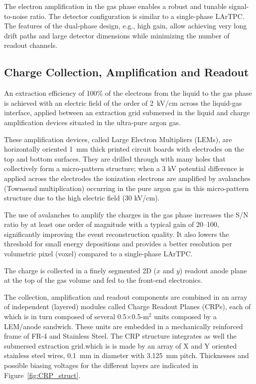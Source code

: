 The electron amplification in the gas phase enables a robust and tunable signal-to-noise ratio. 
The detector configuration is similar to a single-phase LArTPC. The features of the dual-phase design, e.g., high gain, 
allow achieving very long drift paths and large detector dimensions while minimizing the number of readout channels.

\subsection{Charge Collection, Amplification and Readout}

An extraction efficiency of 100\% of the electrons from the liquid to
the gas phase is achieved with an electric field of the order of
2~kV/cm across the liquid-gas interface, applied between an 
extraction grid submersed in the liquid and charge amplification 
devices situated in the ultra-pure argon gas. 

These amplification devices, called Large Electron Multipliers (LEMs), are horizontally oriented 1~mm thick printed 
circuit boards with electrodes on the top and bottom surfaces. They are drilled
through with many holes that collectively form a micro-pattern structure;  
when a 3 kV potential difference is applied across the electrodes
the ionization electrons are amplified by avalanches (Townsend multiplication) occurring in the 
pure argon gas in this micro-pattern structure\cite{Bondar:2008yw} due to the high electric field (30 kV/cm).

The use of avalanches to amplify the charges in the gas phase increases
the S/N ratio by at least one order of magnitude with a typical gain of 20--100, significantly
improving the event reconstruction quality. It also lowers the
threshold for small energy depositions and provides a better
resolution per volumetric pixel (voxel) compared to a single-phase
LArTPC. 

The charge is collected in a finely segmented 2D ($x$ and $y$) readout anode
plane at the top of the gas volume and fed to the front-end electronics.   

The  collection, amplification and readout components are combined in an array of 
independent (layered) modules called Charge Readout Planes (CRPs), each of which is in
 turn composed of several 0.5$\times$0.5-m$^2$ units composed  by a LEM/anode sandwich. 
These units are embedded in a mechanically reinforced frame of FR-4 and Stainless Steel. The CRP structure integrates
as well the submersed extraction grid.which is is made by an array of X and Y oriented stainless steel wires, 0.1~mm in diameter with 3.125~mm
pitch. Thicknesses and possible biasing voltages for the different layers are indicated in Figure~\ref{fig:CRP_struct}.

